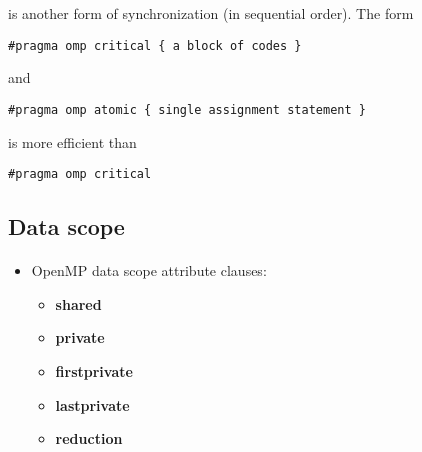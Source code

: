 \documentclass[%
oneside,                 %
final,                   %
10pt]{article}
\begin{document}
is another form of synchronization (in sequential order).
The form


\begin{verbatim}
#pragma omp critical { a block of codes }

\end{verbatim}

and 


\begin{verbatim}
#pragma omp atomic { single assignment statement }

\end{verbatim}

is  more efficient than 


\begin{verbatim}
#pragma omp critical

\end{verbatim}



\subsection*{Data scope}

\paragraph{}
\begin{itemize}
\item OpenMP data scope attribute clauses:
\begin{itemize}

 \item \textbf{shared}

 \item \textbf{private}

 \item \textbf{firstprivate}

 \item \textbf{lastprivate}

 \item \textbf{reduction}
\end{itemize}

\noindent
\end{itemize}
\end{document}
